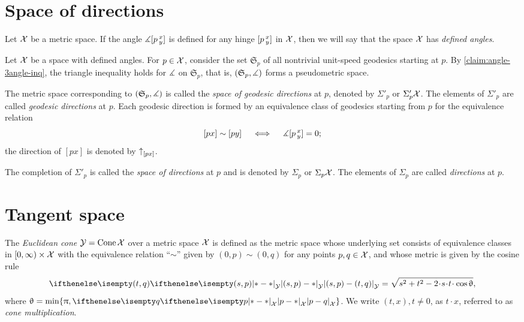 \section{Space of directions} 
\label{sec:tangent-space+directions}

Let $\mathcal{X}$ be a metric space.
If the angle $\measuredangle[p\,{}^{x}_{y}]$ is defined for any hinge $[p\,{}^{x}_{y}]$ in $\mathcal{X}$,
then we will say that the space $\mathcal{X}$ has \emph{defined angles}.

 
Let $\mathcal{X}$ be a space with defined angles. For $p\in \spc{X}$,
consider the set $\mathfrak{S}_p$ 
of all nontrivial unit-speed geodesics starting at $p$.
By \ref{claim:angle-3angle-inq}, the triangle inequality holds for $\measuredangle$ on $\mathfrak{S}_p$,
that is, $(\mathfrak{S}_p,\measuredangle)$ 
forms a pseudometric space.

The metric space corresponding to  $(\mathfrak{S}_p,\measuredangle)$ is called the \emph{space of geodesic directions} at $p$, denoted by $\Sigma'_p$ or $\Sigma'_p\mathcal{X}$.
The elements of $\Sigma'_p$ are called \emph{geodesic directions} at $p$.
Each geodesic direction is formed by an equivalence class of geodesics starting from $p$ 
for the equivalence relation 
\[[px]\sim[py]\quad \iff\quad \measuredangle[p\,{}^{x}_{y}]=0;\]
the direction of $[px]$ is denoted by ${\uparrow}_{[{p}{x}]} $.\index{$\dir{*}{*}$}



The completion of $\Sigma'_p$ is called the \emph{space of directions} at $p$ and is denoted by $\Sigma_p$ or $\Sigma_p\mathcal{X}$.
The elements of $\Sigma_p$ are called \emph{directions} at $p$.

\section{Tangent space}\label{sec: tangent space}

The \emph{Euclidean cone} $\mathcal{Y}=\mathop{\rm Cone}\nolimits\mathcal{X}$ 
over a metric space $\mathcal{X}$
is defined as the metric space whose underlying set consists of
equivalence classes in
$[0,\infty)\times \spc{X}$ with the equivalence relation ``$\sim$'' given by $(0,p)\sim (0,q)$ for any points $p,q\in\spc{X}$,
and whose metric is given by the cosine rule
\[
\dist{(s,p)}{(t,q)}{\spc{Y}} 
=
\sqrt{s^2+t^2-2\cdot s\cdot t\cdot \cos\theta},
\]
where $\theta= \min\{\pi, \dist{p}{q}{\spc{X}}\}$.
We write $(t,x), t \ne 0$, as $t\cdot x$, referred to as \emph{cone multiplication}.

